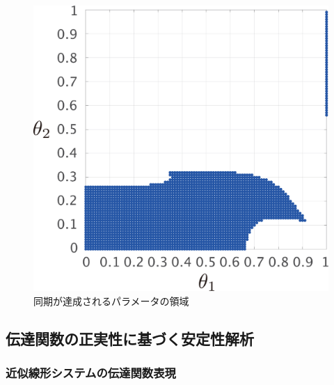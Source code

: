 \documentclass[tombow,dvipdfmx]{corona-a5}
\begin{document}
\begin{figure}[t]
{\begin{minipage}{0.32\linewidth}
  \end{minipage}
  \begin{minipage}{0.32\linewidth}
    \centering
    \includegraphics[width = .85\linewidth]{figs/gam5}
  \end{minipage}
  \caption{同期が達成されるパラメータの領域}
  \label{fig:gamsta}
  }
\end{figure}



\subsection{伝達関数の正実性に基づく安定性解析}

\subsubsection{近似線形システムの伝達関数表現}
\end{document}
